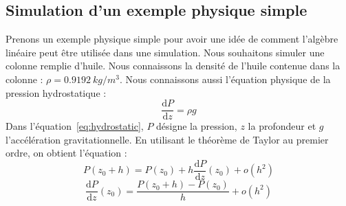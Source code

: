 \subsection{Simulation d'un exemple physique simple}
Prenons un exemple physique simple pour avoir une idée de comment l'algèbre linéaire peut être utilisée dans une simulation.
%
Nous souhaitons simuler une colonne remplie d'huile.
%
Nous connaissons la densité de l'huile contenue dans la colonne : $\rho = 0.9192~kg/m^3$.
%
Nous connaissons aussi l'équation physique de la pression hydrostatique :
%
\begin{equation}
\label{eq:hydrostatic}
\frac{\mathrm d P}{\mathrm d z} = \rho{}g
\end{equation}
%
Dans l'équation~\eqref{eq:hydrostatic}, $P$ désigne la pression, $z$ la profondeur et $g$ l'accélération gravitationnelle.
%
En utilisant le théorème de Taylor au premier ordre, on obtient l'équation :
%
\begin{equation}
P(z_0+h) = P(z_0) + h \frac{\mathrm d P}{\mathrm d z} (z_0) + o(h^2)
\end{equation}
\begin{equation}
\frac{\mathrm d P}{\mathrm d z} (z_0) = \frac{P(z_0+h) - P(z_0)}{h} + o(h^2)
\end{equation}

